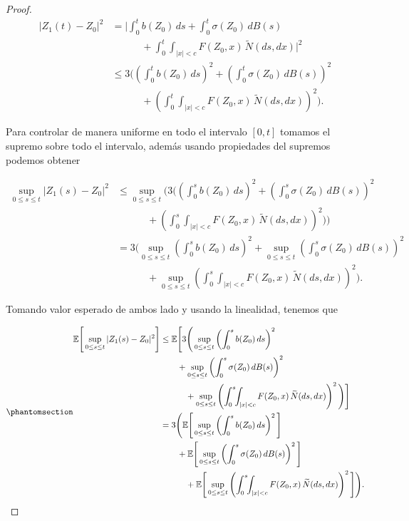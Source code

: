 \documentclass[
  spanish,
  us-letterpaper,
]{scrreprt}
\theoremstyle{plain}
\theoremstyle{plain}
\theoremstyle{definition}
\theoremstyle{plain}
\theoremstyle{remark}
\begin{document}
\begin{proof}
\[
    \begin{aligned}
|Z_1(t)-Z_0|^2
&= \Bigg|
      \int_0^t b(Z_0)\,ds
      + \int_0^t \sigma(Z_0)\,dB(s) \\
&\qquad\quad
      + \int_0^t\!\!\int_{|x|<c} F(Z_0,x)\,\widetilde{N}(ds,dx)
   \Bigg|^2 \\[0.3em]
&\le 3\Bigg(
      \left(\int_0^t b(Z_0)\,ds\right)^2
      + \left(\int_0^t \sigma(Z_0)\,dB(s)\right)^2 \\
&\qquad\quad
      + \left(\int_0^t\!\!\int_{|x|<c} F(Z_0,x)\,\widetilde{N}(ds,dx)\right)^2
   \Bigg).
\end{aligned}
\]

Para controlar de manera uniforme en todo el intervalo \([0,t]\) tomamos
el supremo sobre todo el intervalo, además usando propiedades del
supremos podemos obtener

\[
\begin{aligned}
\sup\limits_{0\leq s\leq t}|Z_1(s)-Z_0|^2
&\leq \sup\limits_{0\leq s\leq t}\Bigg(3\Bigg(
      \left(\int_0^s b(Z_0)\,ds\right)^2
      + \left(\int_0^s \sigma(Z_0)\,dB(s)\right)^2 \\
&\qquad\quad
      + \left(\int_0^s\!\!\int_{|x|<c} F(Z_0,x)\,\widetilde{N}(ds,dx)\right)^2
   \Bigg)\Bigg)\\
& = 3\Bigg(\sup\limits_{0\leq s\leq t}\left(\int_0^s b(Z_0)\,ds\right)^2 + \sup\limits_{0\leq s\leq t} \left(\int_0^s \sigma(Z_0)\,dB(s)\right)^2 \\ 
&\qquad\quad 
    + \sup\limits_{0\leq s\leq t} \left(\int_0^s\!\!\int_{|x|<c} F(Z_0,x)\,\widetilde{N}(ds,dx)\right)^2\Bigg).
\end{aligned}
\]

Tomando valor esperado de ambos lado y usando la linealidad, tenemos que

\begin{equation}\phantomsection\label{eq-5}{
\begin{aligned}
\mathbb{E}\Bigg[\sup\limits_{0\leq s\leq t}|Z_1(s)-Z_0|^2\Bigg]
& \leq \mathbb{E}\Bigg[3\Bigg(\sup\limits_{0\leq s\leq t}\left(\int_0^s b(Z_0)\,ds\right)^2\\
&\qquad   
    + \sup\limits_{0\leq s\leq t} \left(\int_0^s \sigma(Z_0)\,dB(s)\right)^2 \\ 
&\qquad\quad
    + \sup\limits_{0\leq s\leq t} \left(\int_0^s\!\!\int_{|x|<c} F(Z_0,x)\,\widetilde{N}(ds,dx)\right)^2\Bigg)\Bigg]\\
& = 3\Bigg( \mathbb{E}\Bigg[\sup\limits_{0\leq s\leq t}\left(\int_0^s b(Z_0)\,ds\right)^2\Bigg]\\ 
&\qquad
    + \mathbb{E}\Bigg[\sup\limits_{0\leq s\leq t} \left(\int_0^s \sigma(Z_0)\,dB(s)\right)^2\Bigg]\\
&\qquad\quad
    +\mathbb{E}\Bigg[\sup\limits_{0\leq s\leq t} \left(\int_0^s\!\!\int_{|x|<c} F(Z_0,x)\,\widetilde{N}(ds,dx)\right)^2\Bigg]\Bigg).
\end{aligned}
}\end{equation}


\end{proof}
\end{document}
